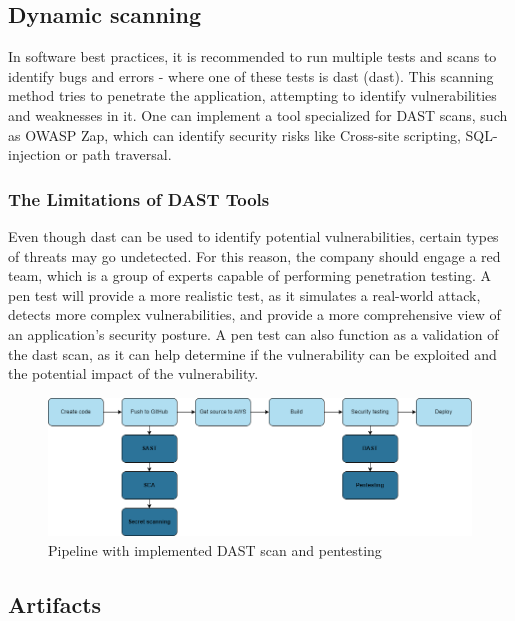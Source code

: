 \subsection{Dynamic scanning}
In software best practices, it is recommended to run multiple tests and scans to identify bugs and errors - where one of these tests is \acrlong{dast} (\acrshort{dast}).\cite{bestpracticeSupplyChain} This scanning method tries to penetrate the application, attempting to identify vulnerabilities and weaknesses in it. One can implement a tool specialized for DAST scans, such as OWASP Zap, which can identify security risks like \gls{Cross-site scripting}, \gls{SQL-injection} or path traversal.\cite{dynamictesting}


\subsubsection{The Limitations of DAST Tools}
Even though \acrshort{dast} can be used to identify potential vulnerabilities, certain types of threats may go undetected. For this reason, the company should engage a red team, which is a group of experts capable of performing penetration testing. A pen test will provide a more realistic test, as it simulates a real-world attack, detects more complex vulnerabilities, and provide a more comprehensive view of an application's security posture. A pen test can also function as a validation of the \acrshort{dast} scan, as it can help determine if the vulnerability can be exploited and the potential impact of the vulnerability. \cite{dastpentesting}

\vspace{2mm}
\begin{figure}[H]
    \centering
    \includegraphics[width=0.8\columnwidth]{Images/pipeline5.png}
    \caption{Pipeline with implemented DAST scan and pentesting}
    \label{fig: Pipeline with implemented DAST scan and pentesting}
\end{figure}

\subsection{Artifacts}



